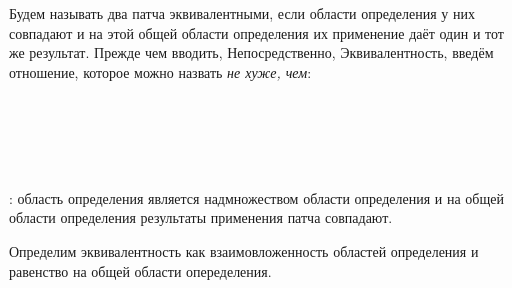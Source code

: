 Будем называть два патча эквивалентными, если области определения у
них совпадают и на этой общей области определения их применение даёт
один и тот же результат. Прежде чем вводить, Непосредственно,
Эквивалентность, введём отношение, которое можно назвать \emph{не
хуже, чем}:

\begin{code}%
\> \AgdaSymbol{:}  \AgdaSymbol{\{}  \AgdaSymbol{:} \AgdaSymbol{\}}\<%
\\
\>[0]\<[2]%
\>[2] \AgdaSymbol{(} \AgdaSymbol{:}  \AgdaSymbol{)}  \AgdaSymbol{(} \AgdaSymbol{:}  \AgdaSymbol{)}  \<%
\\
\> \AgdaSymbol{\{}\AgdaSymbol{\}}   \AgdaSymbol{=}  \AgdaSymbol{\{} \AgdaSymbol{:} \AgdaSymbol{\}}\<%
\\
\>[0]\<[2]%
\>[2] \AgdaSymbol{(} \AgdaSymbol{:}   \AgdaSymbol{)}   \AgdaSymbol{(}  \AgdaSymbol{)}    \<[43]%
\>[43]\<%
\\
\>[2]\<[4]%
\>[4]\AgdaSymbol{(}        \AgdaSymbol{))}\<%
\end{code}

  : область определения
 является надмножеством области определения
 и на общей области определения результаты применения
патча совпадают.

Определим эквивалентность как взаимовложенность областей определения
и равенство на общей области опеределения.

\begin{code}%
\> \AgdaSymbol{:}  \AgdaSymbol{\{}  \AgdaSymbol{:} \AgdaSymbol{\}}\<%
\\
\>[0]\<[2]%
\>[2] \AgdaSymbol{(} \AgdaSymbol{:}  \AgdaSymbol{)}  \AgdaSymbol{(} \AgdaSymbol{:}  \AgdaSymbol{)}  \<%
\\
\>   \AgdaSymbol{=} \AgdaSymbol{(}  \AgdaSymbol{)}  \AgdaSymbol{(}  \AgdaSymbol{)}\<%
\end{code}

